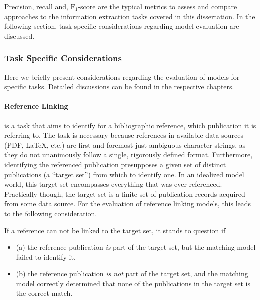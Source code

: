 Precision, recall and, $\text{F}_1$-score are the typical metrics to assess and compare approaches to the information extraction tasks covered in this dissertation. In the following section, task specific considerations regarding model evaluation are discussed.


\subsubsection{Task Specific Considerations}

Here we briefly present considerations regarding the evaluation of models for specific tasks. Detailed discussions can be found in the respective chapters.

\paragraph{Reference Linking}
is a task that aims to identify for a bibliographic reference, which publication it is referring to. The task is necessary because references in available data sources (PDF, \LaTeX, etc.) are first and foremost just ambiguous character strings, as they do not unanimously follow a single, rigorously defined format. Furthermore, identifying the referenced publication presupposes a given set of distinct publications (a ``target set'') from which to identify one. In an idealized model world, this target set encompasses everything that was ever referenced. Practically though, the target set is a finite set of publication records acquired from some data source. For the evaluation of reference linking models, this leads to the following consideration.

If a reference can not be linked to the target set, it stands to question if
\begin{itemize}
    \item (a) the reference publication \emph{is} part of the target set, but the matching model failed to identify it.
    \item (b) the reference publication \emph{is not} part of the target set, and the matching model correctly determined that none of the publications in the target set is the correct match.
\end{itemize}

